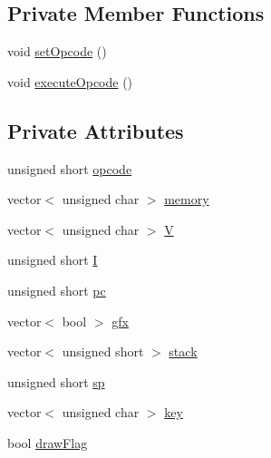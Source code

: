 \subsection*{Private Member Functions}
\begin{DoxyCompactItemize}
\item 
void \hyperlink{classCPU_a0885351f4eab9a347c4f3ecff6cd5365}{set\-Opcode} ()
\item 
void \hyperlink{classCPU_acb46c1c498f7bde079e70d839c66edf0}{execute\-Opcode} ()
\end{DoxyCompactItemize}
\subsection*{Private Attributes}
\begin{DoxyCompactItemize}
\item 
unsigned short \hyperlink{classCPU_a494cb1c2ba6ce16e3a900eaf7b1a5f63}{opcode}
\item 
vector$<$ unsigned char $>$ \hyperlink{classCPU_ab3122e590fe92912f56e1dc5192b9a39}{memory}
\item 
vector$<$ unsigned char $>$ \hyperlink{classCPU_a2fc154eb8eb17dd75c897fc69c48ab31}{V}
\item 
unsigned short \hyperlink{classCPU_adf1fd15edb984e81a9f7adda264aa77a}{I}
\item 
unsigned short \hyperlink{classCPU_a7ebf891c17b973e7aa4b1c2164dcab53}{pc}
\item 
vector$<$ bool $>$ \hyperlink{classCPU_af5dd2f68fb212c8c39fad8522536c8aa}{gfx}
\item 
vector$<$ unsigned short $>$ \hyperlink{classCPU_a89db51ac963d4badd4c9c7a701f1edea}{stack}
\item 
unsigned short \hyperlink{classCPU_a4d0854788d689d0f4ee604f3001b1732}{sp}
\item 
vector$<$ unsigned char $>$ \hyperlink{classCPU_a043e3d085471f4edd7dded7d6b5c399f}{key}
\item 
bool \hyperlink{classCPU_adccd58a3784f03ab908982b072139c1a}{draw\-Flag}
\end{DoxyCompactItemize}


